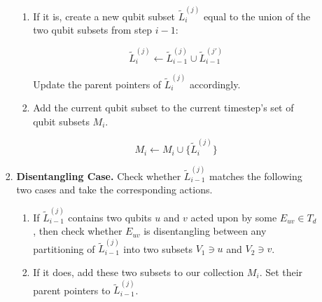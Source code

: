 \begin{enumerate}
\begin{enumerate}
\begin{enumerate}
\begin{enumerate}
\item
If it is, create a new qubit subset
$\tilde{L}^{(j)}_{i}$ equal to the union of the two qubit subsets from
step $i-1$:

\begin{equation*}
\tilde{L}^{(j)}_{i} \leftarrow \tilde{L}^{(j)}_{i-1} \cup \tilde{L}^{(j')}_{i-1}
\end{equation*}

Update the parent pointers of $\tilde{L}^{(j)}_{i}$ accordingly.



\item
Add the current qubit subset to the current timestep's set of qubit subsets $M_i$.

\begin{equation*}
M_i \leftarrow M_i \cup \{ \tilde{L}^{(j)}_{i} \}
\end{equation*}

\end{enumerate}

\item \textbf{Disentangling Case.} Check whether $\tilde{L}^{(j)}_{i-1}$ matches the following two cases
and take the corresponding actions.

\begin{enumerate}
\item If $\tilde{L}^{(j)}_{i-1}$ contains two qubits $u$ and $v$
acted upon by some
$E_{uv} \in T_d$, then check whether $E_{uv}$ is
disentangling between any partitioning of $\tilde{L}^{(j)}_{i-1}$ into two
subsets $V_1 \ni u$ and $V_2 \ni v$.

\item
If it does, add these two subsets to our collection $M_i$.
Set their parent pointers to $\tilde{L}^{(j)}_{i-1}$.


\end{enumerate}
\end{enumerate}
\end{enumerate}
\end{enumerate}
